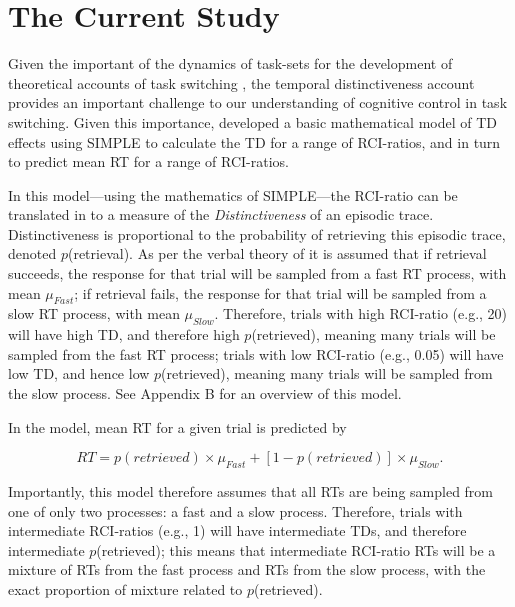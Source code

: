 \documentclass[a4paper, jou, natbib]{apa6}
\begin{document}
\section{The Current Study}

Given the important of the dynamics of task-sets for the development of theoretical accounts of task switching \citep[e.g.,][]{Altmann2008, Schneider2005}, the temporal distinctiveness account provides an important challenge to our understanding of cognitive control in task switching. Given this importance, \cite{Grange2015} developed a basic mathematical model of TD effects using SIMPLE \citep{Brown2007} to calculate the TD for a range of RCI-ratios, and in turn to predict mean RT for a range of RCI-ratios. 

In this model---using the mathematics of SIMPLE---the RCI-ratio can be translated in to a measure of the \emph{Distinctiveness} of an episodic trace. Distinctiveness is proportional to the probability of retrieving this episodic trace, denoted $p$(retrieval). As per the verbal theory of \cite{Horoufchin2011a} it is assumed that if retrieval succeeds, the response for that trial will be sampled from a fast RT process, with mean $\mu_{Fast}$; if retrieval fails, the response for that trial will be sampled from a slow RT process, with mean $\mu_{Slow}$. Therefore, trials with high RCI-ratio (e.g., 20) will have high TD, and therefore high $p$(retrieved), meaning many trials will be sampled from the fast RT process; trials with low RCI-ratio (e.g., 0.05) will have low TD, and hence low $p$(retrieved), meaning many trials will be sampled from the slow process. See Appendix B for an overview of this model.  

In the model, mean RT for a given trial is predicted by

\begin{equation}
RT = p(retrieved) \times \mu_{Fast} + [1 - p(retrieved)] \times \mu_{Slow}.
\label{eq:simpleMixture}
\end{equation}

Importantly, this model therefore assumes that all RTs are being sampled from one of only two processes: a fast and a slow process. Therefore, trials with intermediate RCI-ratios (e.g., 1) will have intermediate TDs, and therefore intermediate $p$(retrieved); this means that intermediate RCI-ratio RTs will be a mixture of RTs from the fast process and RTs from the slow process, with the exact proportion of mixture related to $p$(retrieved). 
    
\end{document}
